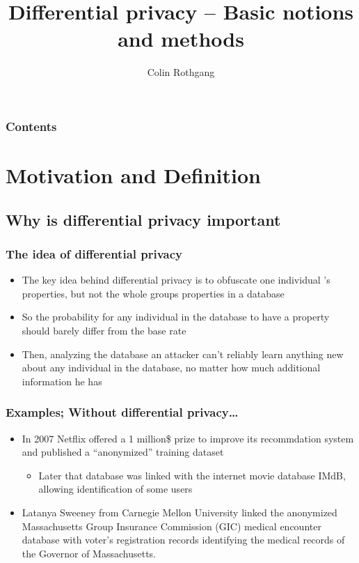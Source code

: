\documentclass[xcolor=dvipsnames]{beamer}
\newcommand{\itm}{\pause\item}
\begin{document}
  \title{Differential privacy -- Basic notions and methods}
  \author{Colin Rothgang}
  \frame{\titlepage}
  \begin{frame}     %
    \frametitle{Contents}
    \tableofcontents
  \end{frame}
  \section{Motivation and Definition}
    \subsection{Why is differential privacy important}
      \begin{frame} %
        \frametitle{The idea of differential privacy}
        \begin{itemize}
          \itm The key idea behind differential privacy is to obfuscate one individual 's properties, but not the whole groups properties in a database
          \itm So the probability for any individual in the database to have a property should barely differ from the base rate
          \itm Then, analyzing the database an attacker can't reliably learn anything new about any individual in the database, no matter how much additional information he has
        \end{itemize}
      \end{frame}
      \begin{frame} %
        \frametitle{Examples; Without differential privacy\ldots}
        \begin{itemize}
          \itm In 2007 Netflix offered a 1 million\$ prize to improve its recommdation system and published a ``anonymized'' training dataset\\
          \begin{itemize}
            \itm[$\hookrightarrow$] Later that database was linked with the internet movie database IMdB, allowing identification of some users
          \end{itemize}
          \itm Latanya Sweeney from Carnegie Mellon University linked the anonymized Massachusetts Group Insurance Commission (GIC) medical encounter database with voter's registration records identifying the medical records of the Governor of Massachusetts.
        \end{itemize}
      \end{frame}
      
\end{document}
